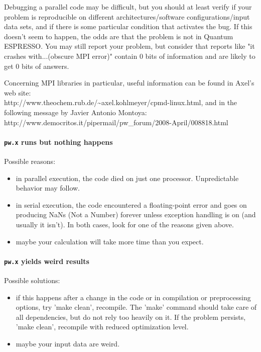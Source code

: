 \documentclass[12pt,a4paper]{article}
\def\qe{{\sc Quantum ESPRESSO}}
\def\pw.x{\texttt{pw.x}}
\begin{document}
Debugging a parallel code may be difficult, but you should at least
verify if your problem is reproducible on different
architectures/software configurations/input data sets, and if  
there is some particular condition that activates the bug. If this
doesn't seem to happen, the odds are that the problem is not in
\qe. You may still report your problem, 
but consider that reports like "it crashes with...(obscure MPI error)"
contain 0 bits of information and are likely to get 0 bits of answers.

Concerning MPI libraries in particular, useful information can be
found in Axel's web site: \\
http://www.theochem.rub.de/\~{}axel.kohlmeyer/cpmd-linux.html, and in the
following message by Javier Antonio Montoya: \\
http://www.democritos.it/pipermail/pw\_forum/2008-April/008818.html

\paragraph{\pw.x runs but nothing happens}
Possible reasons:
\begin{itemize}
\item in parallel execution, the code died on just one
  processor. Unpredictable behavior may follow. 
\item in serial execution, the code encountered a floating-point error
  and goes on producing NaNs (Not a Number) forever unless exception
  handling is on (and usually it isn't). In both cases, look for one
  of the reasons given above. 
\item maybe your calculation will take more time than you expect.
\end{itemize}

\paragraph{\pw.x yields weird results}
Possible solutions:
\begin{itemize}
\item if this happens after a change in the code or in compilation or
  preprocessing options, try 'make clean', recompile. The 'make'
  command should take care of all dependencies, but do not rely too
  heavily on it. If the problem persists, 'make clean', recompile with
  reduced optimization level.  
\item maybe your input data are weird.
\end{itemize}
\end{document}
